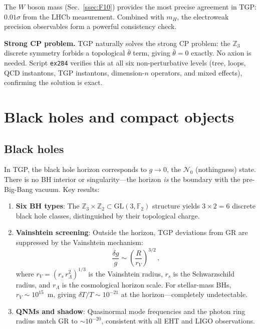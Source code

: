 \documentclass[aps,prd,twocolumn,superscriptaddress,showpacs,
  nofootinbib,floatfix,longbibliography]{revtex4-2}
\newcommand{\Nzero}{\mathcal{N}_0}
\newcommand{\GL}{\mathrm{GL}(3,\mathbb{F}_2)}
\newcommand{\ZZ}{\mathbb{Z}}
\begin{document}
The $W$ boson mass (Sec.~\ref{ssec:F10}) provides the most precise
agreement in TGP: $0.01\sigma$ from the LHCb measurement. Combined
with $m_H$, the electroweak precision observables form a powerful
consistency check.

\textbf{Strong CP problem.}
TGP naturally solves the strong CP problem: the $\ZZ_3$ discrete
symmetry forbids a topological $\bar\theta$ term, giving
$\bar\theta = 0$ exactly. No axion is needed.
Script \texttt{ex284} verifies this at all six non-perturbative levels
(tree, loops, QCD instantons, TGP instantons, dimension-$n$ operators,
and mixed effects), confirming the solution is exact.


\section{Black holes and compact objects}\label{sec:bh}

\subsection{Black holes}\label{ssec:bh-horizon}

In TGP, the black hole horizon corresponds to $g \to 0$, the
$\Nzero$ (nothingness) state. There is no BH interior or
singularity---the horizon \emph{is} the boundary with the
pre-Big-Bang vacuum. Key results:

\begin{enumerate}
\item \textbf{Six BH types}: The $\ZZ_3 \times \ZZ_2 \subset \GL$
  structure yields $3 \times 2 = 6$ discrete black hole classes,
  distinguished by their topological charge.

\item \textbf{Vainshtein screening}: Outside the horizon, TGP
  deviations from GR are suppressed by the Vainshtein mechanism:
  \begin{equation}
    \frac{\delta g}{g} \sim \left(\frac{R}{r_V}\right)^{3/2}\,,
  \end{equation}
  where $r_V = (r_s\, r_\Lambda^2)^{1/3}$ is the Vainshtein radius,
  $r_s$ is the Schwarzschild radius, and $r_\Lambda$ is the
  cosmological horizon scale. For stellar-mass BHs,
  $r_V \sim 10^{15}$~m, giving $\delta T/T \sim 10^{-21}$ at the
  horizon---completely undetectable.

\item \textbf{QNMs and shadow}: Quasinormal mode frequencies and the
  photon ring radius match GR to $\sim 10^{-20}$, consistent with
  all EHT and LIGO observations.
\end{enumerate}
\end{document}
